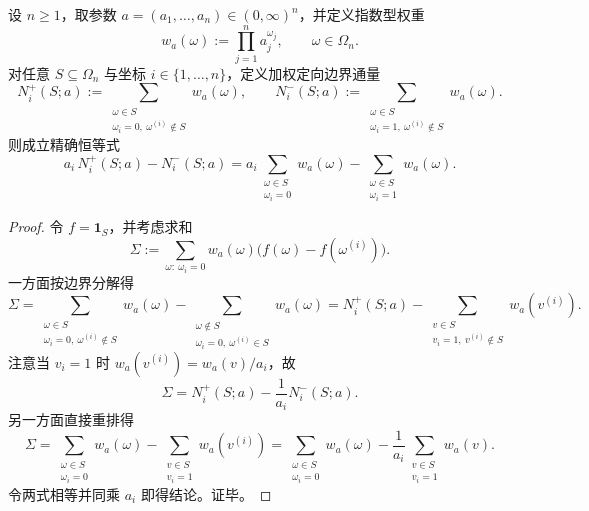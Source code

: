 \begin{proposition}\label{prop:fold-hypercube-weighted-discrete-flux-identity}
设 \(n\ge 1\)，取参数 \(a=(a_1,\dots,a_n)\in(0,\infty)^n\)，并定义指数型权重
\[
w_a(\omega):=\prod_{j=1}^n a_j^{\omega_j},
\qquad
\omega\in\Omega_n.
\]
对任意 \(S\subseteq\Omega_n\) 与坐标 \(i\in\{1,\dots,n\}\)，定义加权定向边界通量
\[
N_i^+(S;a):=\sum_{\substack{\omega\in S\\ \omega_i=0,\ \omega^{(i)}\notin S}} w_a(\omega),
\qquad
N_i^-(S;a):=\sum_{\substack{\omega\in S\\ \omega_i=1,\ \omega^{(i)}\notin S}} w_a(\omega).
\]
则成立精确恒等式
\[
a_i\,N_i^+(S;a)-N_i^-(S;a)
=a_i\sum_{\substack{\omega\in S\\ \omega_i=0}}w_a(\omega)-\sum_{\substack{\omega\in S\\ \omega_i=1}}w_a(\omega).
\]
\end{proposition}
\begin{proof}
令 \(f=\mathbf 1_S\)，并考虑求和
\[
\Sigma:=\sum_{\omega:\ \omega_i=0} w_a(\omega)\bigl(f(\omega)-f(\omega^{(i)})\bigr).
\]
一方面按边界分解得
\[
\Sigma
=\sum_{\substack{\omega\in S\\ \omega_i=0,\ \omega^{(i)}\notin S}}w_a(\omega)
-\sum_{\substack{\omega\notin S\\ \omega_i=0,\ \omega^{(i)}\in S}}w_a(\omega)
=N_i^+(S;a)-\sum_{\substack{v\in S\\ v_i=1,\ v^{(i)}\notin S}}w_a(v^{(i)}).
\]
注意当 \(v_i=1\) 时 \(w_a(v^{(i)})=w_a(v)/a_i\)，故
\[
\Sigma=N_i^+(S;a)-\frac{1}{a_i}N_i^-(S;a).
\]
另一方面直接重排得
\[
\Sigma
=\sum_{\substack{\omega\in S\\ \omega_i=0}}w_a(\omega)
-\sum_{\substack{v\in S\\ v_i=1}}w_a(v^{(i)})
=\sum_{\substack{\omega\in S\\ \omega_i=0}}w_a(\omega)
-\frac{1}{a_i}\sum_{\substack{v\in S\\ v_i=1}}w_a(v).
\]
令两式相等并同乘 \(a_i\) 即得结论。证毕。
\end{proof}

